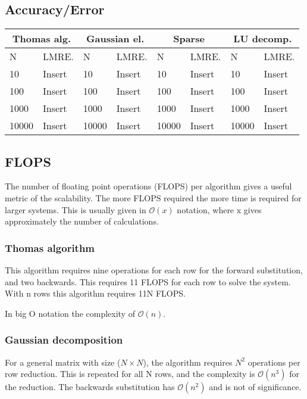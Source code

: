 \documentclass[11pt,a4paper,english,final]{article}
\numberwithin{equation}{section}
\newcommand{\bigO}[1]{\mathcal{O}\left( #1 \right)}
\begin{document}
\subsection{Accuracy/Error}

\begin{tabular}{|l|l|l|l|l|l|l|l|}
\hline
\multicolumn{2}{|c|}{Thomas alg.} & \multicolumn{2}{|c|}{Gaussian el.} & \multicolumn{2}{|c|}{Sparse} & \multicolumn{2}{|c|}{LU decomp.} \\
\hline
N & LMRE. & N & LMRE. & N & LMRE. & N & LMRE.  \\
\hline
10 & Insert & 10 & Insert & 10 & Insert &  10 & Insert \\
100 & Insert & 100 & Insert & 100 & Insert & 100 & Insert \\
1000 & Insert & 1000 & Insert & 1000 & Insert & 1000 & Insert \\
10000 & Insert & 10000 & Insert & 10000 & Insert & 10000 & Insert \\
\hline
\end{tabular}


\subsection{FLOPS}

The number of floating point operations (FLOPS) per algorithm gives a useful 
metric of the scalability. The more FLOPS required the more time is
required for larger systems. This is usually given in $\bigO{x}$ notation,
where x gives approximately the number of calculations.

\subsubsection{Thomas algorithm}
This algorithm requires nine operations for each row for the forward substitution,
and two backwards. This requires 11 FLOPS for each row to solve the system.
With n rows this algorithm requires 11N FLOPS.

In big O notation the complexity of $\bigO{n}$.

\subsubsection{Gaussian decomposition}
For a general matrix with size ($N\times N$), the algorithm requires
$N^2$ operations per row reduction. This is repeated for all N rows,
and the complexity is $\bigO{n^3}$ for the reduction. The backwards 
substitution has $\bigO{n^2}$ and is not of significance.
\end{document}
